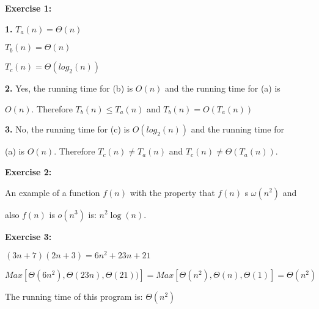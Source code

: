 \documentclass[12pt,letterpaper,final]{report}
\begin{document}
\vline


\noindent\textbf{Exercise 1:}  

\bigskip


\textbf{1.} $T_a(n) = \Theta(n)$

\medskip

\quad $T_b(n) = \Theta(n)$

\medskip

\quad $T_c(n) = \Theta(log_2(n))$


\bigskip

\textbf{2.} Yes, the running time for (b) is $O(n)$ and the running time for (a) is 

$O(n)$. Therefore $T_b(n) \le T_a(n)$ and $T_b(n) = O(T_a(n))$

\bigskip

\textbf{3.} No, the running time for (c) is $O(log_2(n))$ and the running time for 

(a) is $O(n)$. Therefore $T_c(n) \neq T_a(n)$ and $T_c(n) \neq \Theta(T_a(n))$.

\bigskip



\noindent\textbf{Exercise 2:} 

An example of a function $f(n)$ with the property that $f(n)$ s $\omega(n^2)$ and 

also $f(n)$ is $o(n^3)$ is: $n^2\log(n)$.

\bigskip

\noindent\textbf{Exercise 3:}

$(3n+7)(2n+3) = 6n^2 + 23n + 21$





$Max[\Theta(6n^2), \Theta(23n), \Theta(21))] = Max[\Theta(n^2), \Theta(n), \Theta(1)] = \Theta(n^2)$

The running time of this program is: $\Theta(n^2)$
\end{document}
